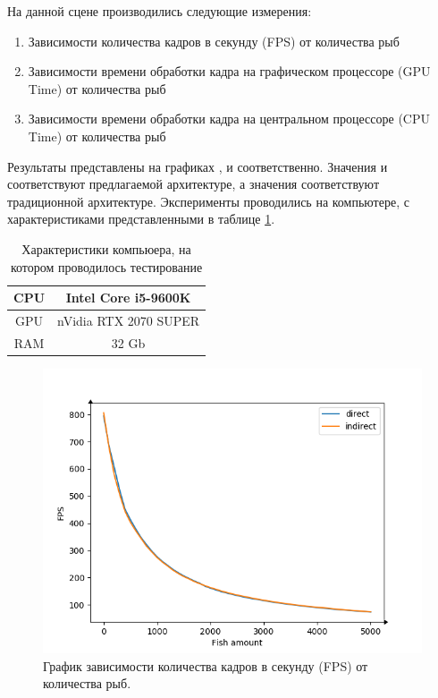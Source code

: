 	\FloatBarrier
	На данной сцене производились следующие измерения:
	\begin{enumerate}[1.]
		\item Зависимости количества кадров в секунду (FPS) от количества рыб
		\item Зависимости времени обработки кадра на графическом процессоре (GPU Time) от количества рыб
		\item Зависимости времени обработки кадра на центральном процессоре (CPU Time) от количества рыб
	\end{enumerate}

	Результаты представлены на графиках ,  и  соответственно. Значения  и соответствуют предлагаемой архитектуре, а значения  соответствуют традиционной архитектуре. Эксперименты проводились на компьютере, с характеристиками представленными в таблице \ref{tab:spec}.
	
	\begin{table}[ht]
		\caption{Характеристики компьюера, на котором проводилось тестирование}
		\label{tab:spec}
		\centering
		\begin{SingleSpace}
			\begin{tabular}{|c|c|}
				\hline
				CPU & Intel Core 
				i5-9600K
				\\
				\hline
				GPU & nVidia RTX 2070 SUPER \\
				\hline
				RAM & 32 Gb \\
				\hline
		\end{tabular}
		\end{SingleSpace}
	\end{table}
	
	\begin{figure}[ht!] 
		\center
		\includegraphics [scale=0.8] {my_folder/images//fps_plot}	
		\caption{График зависимости количества кадров в секунду (FPS) от количества рыб. } 
		\label{fig:fps_plot}
	\end{figure}

